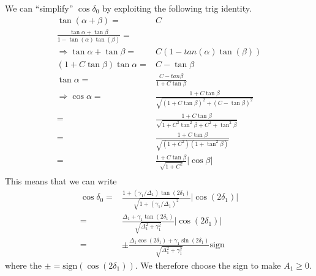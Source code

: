We can ``simplify'' $\cos\delta_0$ by exploiting the following trig identity.
\begin{subequations}
\begin{align}
\tan(\alpha + \beta) = & C \\
\frac{\tan\alpha + \tan\beta}{1 - \tan(\alpha) \tan(\beta)} = & \\
\Rightarrow \tan\alpha + \tan\beta = & C(1-tan(\alpha)\tan(\beta)) \\
(1+C\tan\beta) \tan\alpha = & C - \tan\beta \\
\tan\alpha = & \frac{C - tan\beta}{1 + C\tan\beta} \\ 
\Rightarrow \cos\alpha = & \frac{1+C\tan\beta}{\sqrt{\left(1+C\tan\beta\right)^2 + \left(C -\tan\beta\right)^2}} \\
                       = & \frac{1+C\tan\beta}{\sqrt{1+C^2\tan^2\beta + C^2 + \tan^2\beta}} \\
                       = & \frac{1+C\tan\beta}{\sqrt{\left(1+C^2\right)\left(1+\tan^2\beta\right)}} \\
                       = & \frac{1+C\tan\beta}{\sqrt{1+C^2}}\left| \cos\beta \right| \\
\end{align}
\end{subequations}
This means that we can write
\begin{subequations}
\begin{align}
\cos\delta_0 = & \frac{1+(\gamma_1/\Delta_1)\tan(2\delta_1)}{\sqrt{1+(\gamma_1/\Delta_1)^2}}\left| \cos(2\delta_1) \right| \\
             = & \frac{\Delta_1 + \gamma_1\tan(2\delta_1)}{\sqrt{\Delta_1^2 + \gamma_1^2}}\left|\cos(2\delta_1)\right| \\
             = & \pm \frac{\Delta_1 \cos(2\delta_1) + \gamma_1 \sin(2\delta_1) }{\sqrt{\Delta_1^2 + \gamma_1^2}} \mathrm{sign}
\end{align}
\end{subequations}
where the $\pm = \mathrm{sign}(\cos(2\delta_1))$. We therefore choose the sign to make $A_1 \geq 0$.

